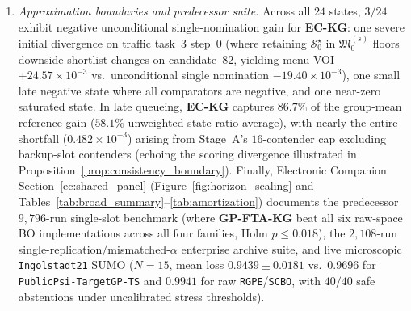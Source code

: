 \begin{enumerate}
  \item \emph{Approximation boundaries and predecessor suite.} Across all $24$ states, $3/24$ exhibit negative unconditional single-nomination gain for \textbf{EC-KG}: one severe initial divergence on traffic task~$3$ step~$0$ (where retaining $\mathcal{S}_0^\star$ in $\mathfrak{M}_0^{(s)}$ floors downside shortlist changes on candidate~$82$, yielding menu VOI $+24.57\times 10^{-3}$ vs.\ unconditional single nomination $-19.40\times 10^{-3}$), one small late negative state where all comparators are negative, and one near-zero saturated state. In late queueing, \textbf{EC-KG} captures $86.7\%$ of the group-mean reference gain ($58.1\%$ unweighted state-ratio average), with nearly the entire shortfall ($0.482\times 10^{-3}$) arising from Stage~A's $16$-contender cap excluding backup-slot contenders (echoing the scoring divergence illustrated in Proposition~\ref{prop:consistency_boundary}). Finally, Electronic Companion Section~\ref*{ec:shared_panel} (Figure~\ref*{fig:horizon_scaling} and Tables~\ref*{tab:broad_summary}--\ref*{tab:amortization}) documents the predecessor $9{,}796$-run single-slot benchmark (where \textbf{GP-FTA-KG} beat all six raw-space BO implementations across all four families, Holm $p\le 0.018$), the $2{,}108$-run single-replication/mismatched-$\alpha$ enterprise archive suite, and live microscopic \texttt{Ingolstadt21} SUMO ($N=15$, mean loss $0.9439\pm 0.0181$ vs.\ $0.9696$ for \texttt{PublicPsi-TargetGP-TS} and $0.9941$ for raw \texttt{RGPE}/\texttt{SCBO}, with $40/40$ safe abstentions under uncalibrated stress thresholds).
\end{enumerate}


\FloatBarrier
